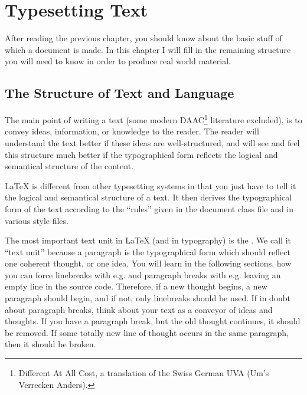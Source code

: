 ﻿%
\chapter{Typesetting Text}

\begin{intro}
  After reading the previous chapter, you should know about the basic
  stuff of which a \LaTeXe{} document is made. In this chapter I
  will fill in the remaining structure you will need to know in order
  to produce real world material.
\end{intro}

\section{The Structure of Text and Language}

The main point of writing a text (some modern DAAC\footnote{Different
  At All Cost, a translation of the Swiss German UVA (Um's Verrecken
  Anders).} literature excluded), is to convey ideas, information, or
knowledge to the reader.  The reader will understand the text better
if these ideas are well-structured, and will see and feel this
structure much better if the typographical form reflects the logical
and semantical structure of the content.

\LaTeX{} is different from other typesetting systems in that you just
have to tell it the logical and semantical structure of a text.  It
then derives the typographical form of the text according to the
``rules'' given in the document class file and in various style files.

The most important text unit in \LaTeX{} (and in typography) is the
.  We call it ``text unit'' because a paragraph is the
typographical form which should reflect one coherent thought, or one
idea.  You will learn in the following sections, how you can force
linebreaks with e.g.{} \texttt{\bs\bs} and paragraph breaks with e.g.{} 
leaving an empty line in the source code.  Therefore, if a new thought
begins, a new paragraph should begin, and if not, only linebreaks
should be used.  If in doubt about paragraph breaks, think about your
text as a conveyor of ideas and thoughts.  If you have a paragraph
break, but the old thought continues, it should be removed.  If some
totally new line of thought occurs in the same paragraph, then it
should be broken.

